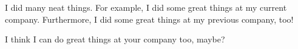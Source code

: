 I did many neat things. For example, I did some great things at my current company.
Furthermore, I did some great things at my previous company, too!

I think I can do great things at your company too, maybe?

